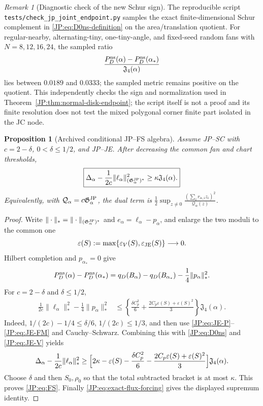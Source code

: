 \documentclass[11pt]{amsart}
\numberwithin{equation}{section}
\newtheorem{proposition}[theorem]{Proposition}
\theoremstyle{definition}
\theoremstyle{remark}
\newtheorem{remark}[theorem]{Remark}
\newcommand{\Jfour}{\mathfrak J_4}
\newcommand{\Gjp}{\mathfrak G^{\rm JP}}
\begin{document}
\begin{remark}[Diagnostic check of the new Schur sign]
The reproducible script
\texttt{tests/check\_jp\_joint\_endpoint.py} samples the exact
finite-dimensional Schur complement in \eqref{JP:eq:D0ns-definition} on the
area/translation quotient.  For regular-nearby, alternating-tiny,
one-tiny-angle, and fixed-seed random fans with
$N=8,12,16,24$, the sampled ratio
\[
 \frac{P_D^{\rm ns}(\alpha)-P_D^{\rm ns}(\alpha_*)}
      {\Jfour(\alpha)}
\]
lies between $0.0189$ and $0.0333$; the sampled metric remains positive on
the quotient.  This independently checks the sign and normalization used
in Theorem~\ref{JP:thm:normal-disk-endpoint}; the script itself is not a proof
and its finite resolution does not test the mixed polygonal corner finite
part isolated in the JC node.
\end{remark}

\begin{proposition}[Archived conditional JP--FS algebra]
\label{JP:prop:FS}
Assume JP--SC with $c=2-\delta$, $0<\delta\le1/2$, and JP--JE.  After
decreasing the common fan and chart thresholds,
\begin{equation}\label{JP:eq:FS}
 \boxed{
 \Delta_\alpha
 -\frac1{2c}\|\ell_\alpha\|_{(\Gjp_\alpha)^*}^2
 \ge\kappa\Jfour(\alpha).}
\end{equation}
Equivalently, with $\mathcal Q_\alpha=c\Gjp_\alpha$, the dual term is
\(
 \frac12\sup_{z\ne0}\frac{(\sum_i r_{\alpha,i}z_i)^2}
 {\mathcal Q_\alpha(z)}
\).
\end{proposition}

\begin{proof}
Write $\|\cdot\|_* =\|\cdot\|_{(\Gjp_\alpha)^*}$ and
$e_\alpha=\ell_\alpha-p_\alpha$, and enlarge the two moduli to the common
one
\[
 \varepsilon(S):=\max\{\varepsilon_V(S),
                         \varepsilon_{\rm JE}(S)\}\longrightarrow0.
\]
Hilbert completion and
$p_{\alpha_*}=0$ give
\[
 P_D^{\rm ns}(\alpha)-P_D^{\rm ns}(\alpha_*)
 =q_D(B_\alpha)-q_D(B_{\alpha_*})
  -\frac14\|p_\alpha\|_*^2.
\]
For $c=2-\delta$ and $\delta\le1/2$,
\begin{align*}
 \frac1{2c}\|\ell_\alpha\|_*^2-\frac14\|p_\alpha\|_*^2
 &\le\left\{
 \frac{\delta C_p^2}{6}
 +\frac{2C_p\varepsilon(S)
        +\varepsilon(S)^2}{3}\right\}\Jfour(\alpha).
\end{align*}
Indeed,
$1/(2c)-1/4\le\delta/6$, $1/(2c)\le1/3$, and then use
\eqref{JP:eq:JE-P}--\eqref{JP:eq:JE-FM} and Cauchy--Schwarz.  Combining this
with \eqref{JP:eq:D0ns} and \eqref{JP:eq:JE-V} yields
\begin{align*}
 \Delta_\alpha-\frac1{2c}\|\ell_\alpha\|_*^2
 \ge\Bigl[2\kappa-\varepsilon(S)
 -\frac{\delta C_p^2}{6}
 -\frac{2C_p\varepsilon(S)
        +\varepsilon(S)^2}{3}\Bigr]\Jfour(\alpha).
\end{align*}
Choose $\delta$ and then $S_0,\rho_0$ so that the total subtracted bracket
is at most $\kappa$.  This proves \eqref{JP:eq:FS}.  Finally
\eqref{JP:eq:exact-flux-forcing} gives the displayed supremum identity.
\end{proof}
\end{document}
